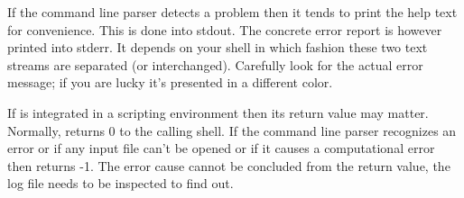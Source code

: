If the command line parser detects a problem then it tends to print the
help text for convenience. This is done into stdout. The concrete error
report is however printed into stderr. It depends on your shell in which
fashion these two text streams are separated (or interchanged). Carefully
look for the actual error message; if you are lucky it's presented in a
different color.

If \linnet{} is integrated in a scripting environment then its return
value may matter. Normally, \linnet{} returns 0 to the calling shell. If
the command line parser recognizes an error or if any input file can't be
opened or if it causes a computational error then \linnet{} returns -1.
The error cause cannot be concluded from the return value, the log file
needs to be inspected to find out.


